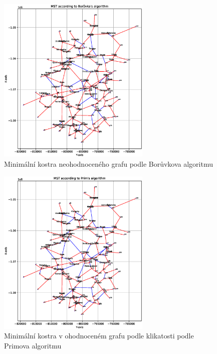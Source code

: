 \begin{figure}[H]
    \centering
    \includegraphics[width=0.65\textwidth]{images/Figure_3.eps}
    \caption{Minimální kostra neohodnoceného grafu podle Borůvkova algoritmu}
\end{figure}
\begin{figure}[H]
    \centering
    \includegraphics[width=0.65\textwidth]{images/Figure_2_curvature.eps}
    \caption{Minimální kostra v ohodnoceném grafu podle klikatosti podle Primova algoritmu}
\end{figure}

